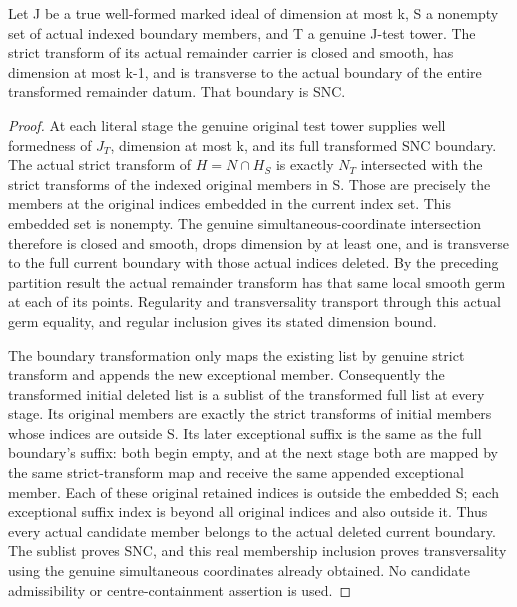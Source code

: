 \begin{lemma}
\label{hir:member-tail-actual-geometry}
\leanok
Let J be a true well-formed marked ideal of dimension at most k, S a nonempty set of actual indexed boundary members, and T a genuine
J-test tower. The strict transform of its actual remainder carrier is closed
and smooth, has dimension at most k-1, and is transverse to the actual boundary
of the entire transformed remainder datum. That boundary is SNC.
\end{lemma}
\begin{proof}
At each literal stage the genuine original test tower supplies well formedness
of $J_T$, dimension at most k, and its full transformed SNC boundary. The actual
strict transform of $H=N\cap H_S$ is exactly $N_T$ intersected with the strict
transforms of the indexed original members in S. Those are precisely the
members at the original indices embedded in the current index set. This
embedded set is nonempty. The genuine simultaneous-coordinate intersection
therefore is closed and smooth, drops dimension by at least one, and is
transverse to the full current boundary with those actual indices deleted.
By the preceding partition result the actual remainder transform has that
same local smooth germ at each of its points. Regularity and transversality
transport through this actual germ equality, and regular inclusion gives its
stated dimension bound.

The boundary transformation only maps the existing list by genuine strict
transform and appends the new exceptional member. Consequently the transformed
initial deleted list is a sublist of the transformed full list at every stage.
Its original members are exactly the strict transforms of initial members
whose indices are outside S. Its later exceptional suffix is the same as the
full boundary's suffix: both begin empty, and at the next stage both are mapped
by the same strict-transform map and receive the same appended exceptional
member. Each of these original retained indices is outside the embedded S;
each exceptional suffix index is beyond all original indices and also outside
it. Thus every actual candidate member belongs to the actual deleted current
boundary. The sublist proves SNC, and this real membership inclusion proves
transversality using the genuine simultaneous coordinates already obtained.
No candidate admissibility or centre-containment assertion is used.
\end{proof}

